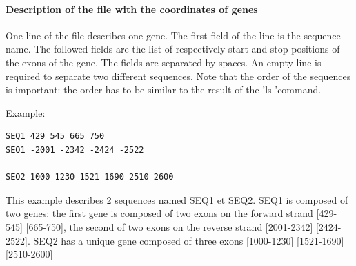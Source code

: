 \documentclass[a4paper,titlepage]{report}
\begin{document}
\paragraph{Description of the file with the coordinates of genes}
One line of the file describes one gene. The first field of the line is the sequence name. The followed fields are the list of respectively start and stop positions of the exons of the gene. 
The fields are separated by spaces.
An empty line is required to separate two different sequences.
Note that the order of the sequences is important: the order has to be similar to the result of the 'ls 'command.

Example:
{\scriptsize \begin{verbatim}
SEQ1 429 545 665 750
SEQ1 -2001 -2342 -2424 -2522

SEQ2 1000 1230 1521 1690 2510 2600

\end{verbatim}}
This example describes 2 sequences named SEQ1 et SEQ2. SEQ1 is composed of two genes: the first gene is composed of two exons on the forward strand [429-545] [665-750], 
the second of two exons on the reverse strand [2001-2342] [2424-2522].
SEQ2 has a unique gene composed of three exons [1000-1230] [1521-1690] [2510-2600]
\end{document}
